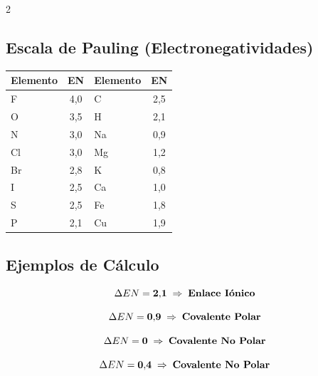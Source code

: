 \documentclass[9pt, landscape, letterpaper]{extarticle}
\begin{document}
\begin{multicols}{2}
  \subsection{Escala de Pauling (Electronegatividades)}

  \begin{tablabox}
    \tablacompacta
    \begin{tabular}{@{}l c l c@{}}
      \toprule
      Elemento & EN   & Elemento & EN   \\
      \midrule
      F  & 4{,}0 & C  & 2{,}5 \\
      O  & 3{,}5 & H  & 2{,}1 \\
      N  & 3{,}0 & Na & 0{,}9 \\
      Cl & 3{,}0 & Mg & 1{,}2 \\
      Br & 2{,}8 & K  & 0{,}8 \\
      I  & 2{,}5 & Ca & 1{,}0 \\
      S  & 2{,}5 & Fe & 1{,}8 \\
      P  & 2{,}1 & Cu & 1{,}9 \\
      \bottomrule
    \end{tabular}
  \end{tablabox}

  \subsection{Ejemplos de Cálculo}

  \begin{despejesbox}[NaCl — $\Delta EN = 3{,}0 - 0{,}9$]
    $$\Delta EN = \mathbf{2{,}1} \;\Rightarrow\; \text{\textbf{Enlace Iónico}}$$
  \end{despejesbox}

  \begin{despejesbox}[HCl — $\Delta EN = 3{,}0 - 2{,}1$]
    $$\Delta EN = \mathbf{0{,}9} \;\Rightarrow\; \text{\textbf{Covalente Polar}}$$
  \end{despejesbox}

  \begin{despejesbox}[O$_2$ — $\Delta EN = 3{,}5 - 3{,}5$]
    $$\Delta EN = \mathbf{0} \;\Rightarrow\; \text{\textbf{Covalente No Polar}}$$
  \end{despejesbox}

  \begin{despejesbox}[C--H — $\Delta EN = 2{,}5 - 2{,}1$]
    $$\Delta EN = \mathbf{0{,}4} \;\Rightarrow\; \text{\textbf{Covalente No Polar}}$$
  \end{despejesbox}


\end{multicols}
\end{document}
